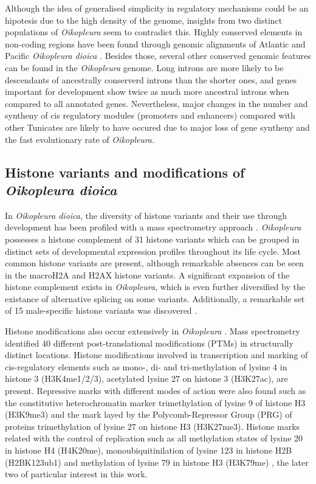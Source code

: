 \documentclass[11pt,twoside,a4paper]{report}
\begin{document}
		Although the idea of generalised simplicity in regulatory mechanisms could be an hipotesis due to the high density of the genome, insights from two distinct populations of \textit{Oikopleura} seem to contradict this. Highly conserved elements in non-coding regions have been found through genomic alignments of Atlantic and Pacific \textit{Oikopleura dioica} \cite{Denoeud2010a}. Besides those, several other conserved genomic features can be found in the \textit{Oikopleura} genome. 	Long introns are more likely to be descendants of ancestrally conserverd introns than the shorter ones, and genes important for development show twice as much more ancestral introns when compared to all annotated genes. Nevertheless, major changes in the number and syntheny of cis regulatory modules (promoters and enhancers) compared with other Tunicates are likely to have occured due to major loss of gene syntheny and the fast evolutionary rate of \textit{Oikopleura}.
		
		\subsection{Histone variants and modifications of \textit{Oikopleura dioica}}
		In \textit{Oikopleura dioica}, the diversity of histone variants and their use through development has been profiled with a mass spectrometry approach \cite{Moosmann2011}. \textit{Oikopleura} possesses a histone complement of 31 histone variants which can be grouped in distinct sets of developmental expression profiles throughout its life cycle. Most common histone variants are present, although remarkable absences can be seen in the macroH2A and H2AX histone variants. A significant expansion of the histone complement exists in \textit{Oikopleura}, which is even further diversified by the existance of alternative splicing on some variants. Additionally, a remarkable set of 15 male-specific histone variants was discovered \cite{Moosmann2011}.
		
		Histone modifications also occur extensively in \textit{Oikopleura} \cite{Moosmann2011}.	Mass spectrometry identified 40 different post-translational modifications (PTMs) in structurally distinct locations. Histone modifications involved in transcription and marking of cis-regulatory elements such as mono-, di- and tri-methylation of lysine 4 in histone 3 (H3K4me1/2/3), acetylated lysine 27 on histone 3 (H3K27ac), are present. 
		Repressive marks with different modes of action were also found such as the constitutive heterochromatin marker trimethylation of lysine 9 of histone H3 (H3K9me3) and the mark layed by the Polycomb-Repressor Group (PRG) of proteins trimethylation of lysine 27 on histone H3 (H3K27me3). Histone marks related with the control of replication such as all methylation states of lysine 20 in histone H4 (H4K20me), monoubiquitinilation of lysine 123 in histone H2B (H2BK123ub1) and methylation of lysine 79 in histone H3 (H3K79me) , the later two of particular interest in this work.
		
\end{document}
